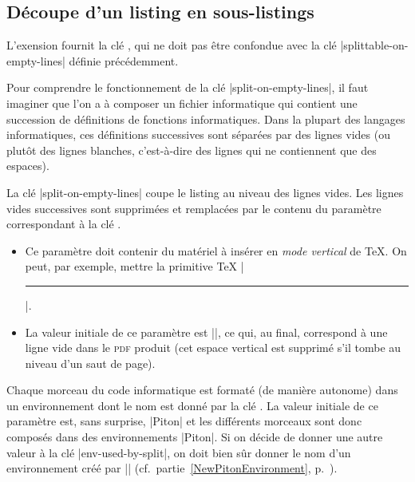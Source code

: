 \documentclass[dvipsnames,svgnames]{article}
\begin{document}
\bigskip
\subsection{Découpe d'un listing en sous-listings}

\label{split-on-empty-lines}

L'exension  fournit la clé , qui ne doit pas
être confondue avec la clé |splittable-on-empty-lines| définie précédemment. 

\smallskip
Pour comprendre le fonctionnement de la clé |split-on-empty-lines|, il faut imaginer que
l'on a à composer un fichier informatique qui contient une succession de définitions de
fonctions informatiques. Dans la plupart des langages informatiques, ces définitions
successives sont séparées par des lignes vides (ou plutôt des lignes blanches,
c'est-à-dire des lignes qui ne contiennent que des espaces). 

\smallskip
La clé |split-on-empty-lines| coupe le listing au niveau des lignes vides. Les lignes
vides successives sont supprimées et remplacées par le contenu du paramètre correspondant
à la clé .
\begin{itemize}
\item Ce paramètre doit contenir du matériel à insérer en \emph{mode vertical} de TeX. On
peut, par exemple, mettre la primitive TeX |\hrule|.

\item La valeur initiale de ce paramètre est |\vspace{\baselineskip}\vspace{-1.25pt}|, ce qui,
au final, correspond à une ligne vide dans le \textsc{pdf} produit (cet espace vertical
est supprimé s'il tombe au niveau d'un saut de page). 
\end{itemize}


Chaque morceau du code informatique est formaté (de manière autonome) dans un
environnement dont le nom est donné par la clé . La valeur
initiale de ce paramètre est, sans surprise, |Piton| et les différents morceaux sont donc
composés dans des environnements |{Piton}|. Si on décide de donner une autre valeur à la
clé |env-used-by-split|, on doit bien sûr donner le nom d'un environnement créé par
|\NewPitonEnvironment| (cf.~partie~\ref{NewPitonEnvironment},
p.~\pageref{NewPitonEnvironment}).
\end{document}
